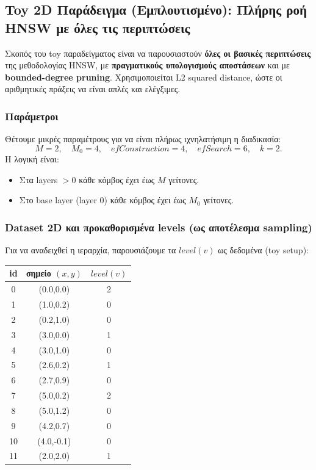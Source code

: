 \documentclass[12pt,a4paper]{article}
\begin{document}
\subsection{Toy 2D Παράδειγμα (Εμπλουτισμένο): Πλήρης ροή HNSW με όλες τις περιπτώσεις}
\label{subsec:toy2d_expanded}

Σκοπός του toy παραδείγματος είναι να παρουσιαστούν \textbf{όλες οι βασικές περιπτώσεις} της μεθοδολογίας HNSW,
με \textbf{πραγματικούς υπολογισμούς αποστάσεων} και με \textbf{bounded-degree pruning}.
Χρησιμοποιείται L2 squared distance, ώστε οι αριθμητικές πράξεις να είναι απλές και ελέγξιμες.

\subsubsection{Παράμετροι}
Θέτουμε μικρές παραμέτρους για να είναι πλήρως ιχνηλατήσιμη η διαδικασία:
\[
M=2,\quad M_0=4,\quad efConstruction=4,\quad efSearch=6,\quad k=2.
\]
Η λογική είναι:
\begin{itemize}
    \item Στα layers $>0$ κάθε κόμβος έχει έως $M$ γείτονες.
    \item Στο base layer (layer 0) κάθε κόμβος έχει έως $M_0$ γείτονες.
\end{itemize}

\subsubsection{Dataset 2D και προκαθορισμένα levels (ως αποτέλεσμα sampling)}
Για να αναδειχθεί η ιεραρχία, παρουσιάζουμε τα $level(v)$ ως δεδομένα (toy setup):
\begin{center}
\begin{tabular}{c c c}
\toprule
id & σημείο $(x,y)$ & $level(v)$ \\
\midrule
0 & (0.0,0.0) & 2 \\
1 & (1.0,0.2) & 0 \\
2 & (0.2,1.0) & 0 \\
3 & (3.0,0.0) & 1 \\
4 & (3.0,1.0) & 0 \\
5 & (2.6,0.2) & 1 \\
6 & (2.7,0.9) & 0 \\
7 & (5.0,0.2) & 2 \\
8 & (5.0,1.2) & 0 \\
9 & (4.2,0.7) & 0 \\
10 & (4.0,-0.1) & 0 \\
11 & (2.0,2.0) & 1 \\
\bottomrule
\end{tabular}
\end{center}
\end{document}
